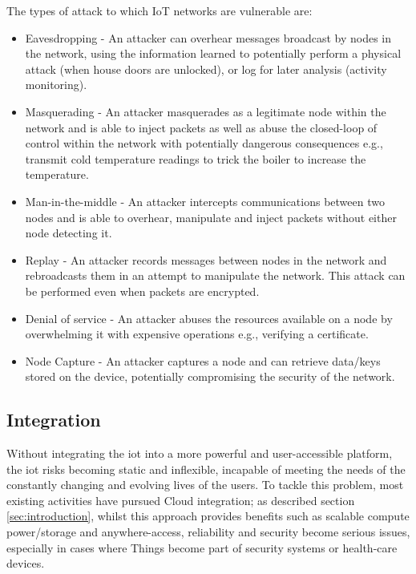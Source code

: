 \documentclass{mpaper}
\begin{document}
The types of attack to which IoT networks are vulnerable are:
\begin{itemize}
  \item Eavesdropping - An attacker can overhear messages broadcast by nodes in the network, using the information learned to potentially perform a physical attack (when house doors are unlocked), or log for later analysis (activity monitoring).  
  \item Masquerading - An attacker masquerades as a legitimate node within the network and is able to inject packets as well as abuse the closed-loop of control within the network with potentially dangerous consequences e.g., transmit cold temperature readings to trick the boiler to increase the temperature.
  \item Man-in-the-middle - An attacker intercepts communications between two nodes and is able to overhear, manipulate and inject packets without either node detecting it. 
  \item Replay - An attacker records messages between nodes in the network and rebroadcasts them in an attempt to manipulate the network. This attack can be performed even when packets are encrypted. 
  \item Denial of service - An attacker abuses the resources available on a node by overwhelming it with expensive operations e.g., verifying a certificate.
  \item Node Capture - An attacker captures a node and can retrieve data/keys stored on the device, potentially compromising the security of the network.
\end{itemize}

\subsection{Integration} %
\label{sub:integration}
Without integrating the iot into a more powerful and user-accessible platform, the iot risks becoming static and inflexible, incapable of meeting the needs of the constantly changing and evolving lives of the users. To tackle this problem, most existing activities have pursued Cloud integration\cite{SmartThings,Twine,Belkin}; as described section \ref{sec:introduction}, whilst this approach provides benefits such as scalable compute power/storage and anywhere-access, reliability and security become serious issues, especially in cases where Things become part of security systems or health-care devices.
\end{document}
